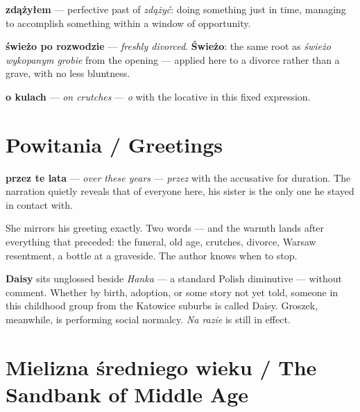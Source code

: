 \textbf{zdążyłem} --- perfective past of \textit{zdążyć}: doing something 
just in time, managing to accomplish something within a window of opportunity.

\textbf{świeżo po rozwodzie} --- \textit{freshly divorced}. \textbf{Świeżo}: 
the same root as \textit{świeżo wykopanym grobie} from the opening --- 
applied here to a divorce rather than a grave, with no less bluntness.

\textbf{o kulach} --- \textit{on crutches} --- \textit{o} with the locative 
in this fixed expression.

\section{Powitania / Greetings}


\textbf{przez te lata} --- \textit{over these years} --- \textit{przez} with 
the accusative for duration. The narration quietly reveals that of everyone 
here, his sister is the only one he stayed in contact with.



She mirrors his greeting exactly. Two words --- and the warmth lands after 
everything that preceded: the funeral, old age, crutches, divorce, Warsaw 
resentment, a bottle at a graveside. The author knows when to stop.



\textbf{Daisy} sits unglossed beside \textit{Hanka} --- a standard Polish 
diminutive --- without comment. Whether by birth, adoption, or some story 
not yet told, someone in this childhood group from the Katowice suburbs 
is called Daisy. Groszek, meanwhile, is performing social normalcy. 
\textit{Na razie} is still in effect.

\section{Mielizna średniego wieku / The Sandbank of Middle Age}

